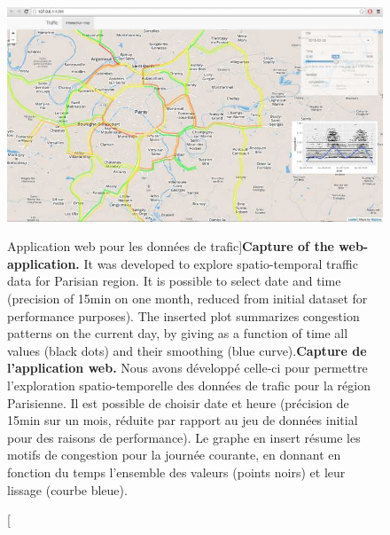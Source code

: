  


\begin{figure}
\includegraphics[width=\linewidth]{Figures/Final/8-1-2-fig-transportationequilibrium-fig-1.jpg}
\caption[Web-application for traffic data][Application web pour les données de trafic]{\textbf{Capture of the web-application.} It was developed to explore spatio-temporal traffic data for Parisian region. It is possible to select date and time (precision of 15min on one month, reduced from initial dataset for performance purposes). The inserted plot summarizes congestion patterns on the current day, by giving as a function of time all values (black dots) and their smoothing (blue curve).\label{fig:transportationequilibrium:fig-1}}{\textbf{Capture de l'application web.} Nous avons développé celle-ci pour permettre l'exploration spatio-temporelle des données de trafic pour la région Parisienne. Il est possible de choisir date et heure (précision de 15min sur un mois, réduite par rapport au jeu de données initial pour des raisons de performance). Le graphe en insert résume les motifs de congestion pour la journée courante, en donnant en fonction du temps l'ensemble des valeurs (points noirs) et leur lissage (courbe bleue).\label{fig:transportationequilibrium:fig-1}}
\end{figure}



